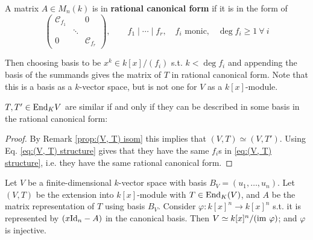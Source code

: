 \documentclass{article}
\begin{document}
\begin{definition}
    A matrix $A\in M_n(k)$ is in \textbf{rational canonical form} if it is in the form of
    \[
        \begin{pmatrix}
            \mathcal{C}_{f_1} & & 0 \\
            & \ddots & \\
            0 & & \mathcal{C}_{f_r}
        \end{pmatrix}, \qquad f_1\mid \cdots \mid f_r,\quad f_i \text{ monic,}\quad \deg f_i \geq 1\ \forall\ i
    \]
\end{definition}

Then choosing basis to be $x^k \in k[x]/(f_i)$ s.t. $k < \deg f_i$ and appending the basis of the summands gives the matrix of $T$ in rational canonical form. Note that this is a basis as a $k$-vector space, but is not one for $V$ as a $k[x]$-module. 

\begin{remark}
    $T, T'\in\mathrm{End}_K{V}$ are similar if and only if they can be described in some basis in the rational canonical form:
\end{remark}

\begin{proof}
    By Remark \ref{prop:(V, T) isom} this implies that $(V, T) \simeq (V, T')$. Using Eq. \eqref{eq:(V, T) structure} gives that they have the same $f_i$s in \eqref{eq:(V, T) structure}, i.e. they have the same rational canonical form.
\end{proof}

\begin{proposition}
    Let $V$ be a finite-dimensional $k$-vector space with basis $B_V = (u_1, \ldots , u_n)$. Let $(V, T)$ be the extension into $k[x]$-module with $T\in\mathrm{End}_K(V)$, and $A$ be the matrix representation of $T$ using basis $B_V$. Consider $\varphi: k[x]^n \to k[x]^n$ s.t. it is represented by $(x\mathrm{Id}_n - A)$ in the canonical basis. Then $V \simeq k[x]^n/(\mathrm{im}\  \varphi)$; and $\varphi$ is injective. 
\end{proposition}
\end{document}
